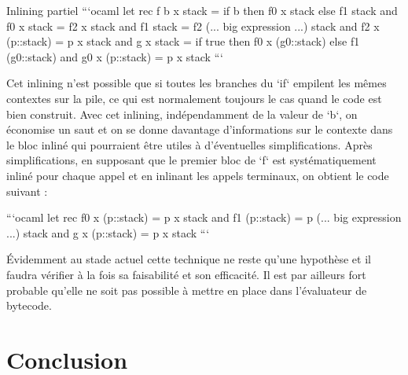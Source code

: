 \documentclass{beamer}
\begin{document}
\begin{frame}{Inlining partiel}
    ```ocaml
    let rec f b x stack =
      if b then f0 x stack else f1 stack
    and f0 x stack =
      f2 x stack
    and f1 stack =
      f2 (... big expression ...) stack
    and f2 x (p::stack) =
      p x stack
    and g x stack =
      if true then f0 x (g0::stack) else f1 (g0::stack)
    and g0 x (p::stack) =
      p x stack
    ```
    
    Cet inlining n'est possible que si toutes les branches du `if` empilent les mêmes contextes sur la pile, ce qui est normalement toujours le cas quand le code est bien construit. Avec cet inlining, indépendamment de la valeur de `b`, on économise un saut et on se donne davantage d'informations sur le contexte dans le bloc inliné qui pourraient être utiles à d'éventuelles simplifications. Après simplifications, en supposant que le premier bloc de `f` est systématiquement inliné pour chaque appel et en inlinant les appels terminaux, on obtient le code suivant :
    
    ```ocaml
    let rec f0 x (p::stack) =
      p x stack
    and f1 (p::stack) =
      p (... big expression ...) stack
    and g x (p::stack) =
      p x stack
    ```
    
    Évidemment au stade actuel cette technique ne reste qu'une hypothèse et il faudra vérifier à la fois sa faisabilité et son efficacité. Il est par ailleurs fort probable qu'elle ne soit pas possible à mettre en place dans l'évaluateur de bytecode.
\end{frame}

\fi


\section{Conclusion}
\end{document}
